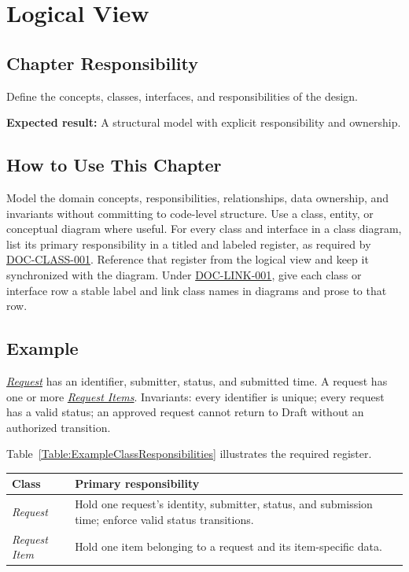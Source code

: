 \chapter{Logical View}
\section{Chapter Responsibility}
\label{Section:LogicalViewResponsibility}
Define the concepts, classes, interfaces, and responsibilities of the design.

\noindent\textbf{Expected result:} A structural model with explicit responsibility and ownership.

\section{How to Use This Chapter}
Model the domain concepts, responsibilities, relationships, data ownership, and invariants without committing to code-level structure. Use a class, entity, or conceptual diagram where useful. For every class and interface in a class diagram, list its primary responsibility in a titled and labeled register, as required by \hyperref[Requirement:DOCCLASS001]{DOC-CLASS-001}. Reference that register from the logical view and keep it synchronized with the diagram. Under \hyperref[Requirement:DOCLINK001]{DOC-LINK-001}, give each class or interface row a stable label and link class names in diagrams and prose to that row.
\section{Example}
\hyperref[Class:Request]{\textit{Request}} has an identifier, submitter, status, and submitted time. A request has one or more \hyperref[Class:RequestItem]{\textit{Request Items}}. Invariants: every identifier is unique; every request has a valid status; an approved request cannot return to Draft without an authorized transition.


Table~\ref{Table:ExampleClassResponsibilities} illustrates the required register.
\begin{tabularx}{\linewidth}{L{4.2cm}Y}
\caption{Example Class Responsibilities Register\label{Table:ExampleClassResponsibilities}}\\
\toprule Class & Primary responsibility\\\midrule
{}\label{Class:Request}\textit{Request} & Hold one request's identity, submitter, status, and submission time; enforce valid status transitions.\\
\label{Class:RequestItem}\textit{Request Item} & Hold one item belonging to a request and its item-specific data.\\\bottomrule
\end{tabularx}
